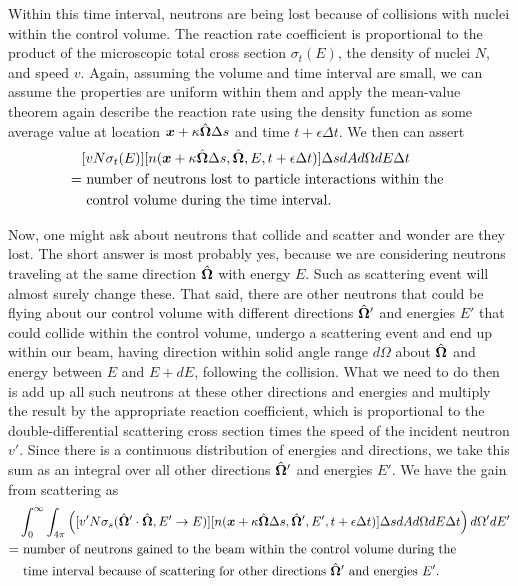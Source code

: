 Within this time interval, neutrons are being lost because of collisions with nuclei within the control volume. The reaction rate coefficient is proportional to the product of the microscopic total cross section $\sigma_t(E)$, the density of nuclei $N$, and speed $v$. Again, assuming the volume and time interval are small, we can assume the properties are uniform within them and apply the mean-value theorem again describe the reaction rate using the density function as some average value at location $\bm{x} + \kappa \hat{\mathbf{\Omega}} \Delta s$ and time $t + \epsilon \Delta t$. We then can assert
\begin{align}
  &[ v N \sigma_t(E) ] [ n( \bm{x} + \kappa \hat{\mathbf{\Omega}} \Delta s, \hat{\mathbf{\Omega}}, E, t + \epsilon \Delta t )  ] \Delta s dA d\Omega dE \Delta t \nonumber \\
  =	&\text{ number of neutrons lost to particle interactions within the } \nonumber \\
  	&\text{ control volume during the time interval. }
\end{align}

Now, one might ask about neutrons that collide and scatter and wonder are they lost. The short answer is most probably yes, because we are considering neutrons traveling at the same direction $\hat{\mathbf{\Omega}}$ with energy $E$. Such as scattering event will almost surely change these. That said, there are other neutrons that could be flying about our control volume with different directions $\hat{\mathbf{\Omega}}'$ and energies $E'$ that could collide within the control volume, undergo a scattering event and end up within our beam, having direction within solid angle range $d\Omega$ about $\hat{\mathbf{\Omega}}$ and energy between $E$ and $E + dE$, following the collision. What we need to do then is add up all such neutrons at these other directions and energies and multiply the result by the appropriate reaction coefficient, which is proportional to the double-differential scattering cross section times the speed of the incident neutron $v'$. Since there is a continuous distribution of energies and directions, we take this sum as an integral over all other directions $\hat{\mathbf{\Omega}}'$ and energies $E'$. We have the gain from scattering as
\begin{align}
  &\int_0^\infty \int_{4\pi} \left( [ v' N \sigma_s(\hat{\mathbf{\Omega}}' \cdot \hat{\mathbf{\Omega}}, E' \rightarrow E ) ] [ n( \bm{x} + \kappa \hat{\mathbf{\Omega}} \Delta s, \hat{\mathbf{\Omega}}', E', t + \epsilon \Delta t )  ] \Delta s dA d\Omega dE \Delta t \right) d\Omega' dE' \nonumber \\
  =	&\text{ number of neutrons gained to the beam within the  control volume during the } \nonumber \\
  	&\text{ time interval because of scattering for other directions $\hat{\mathbf{\Omega}}'$ and energies $E'$.} 
\end{align}

